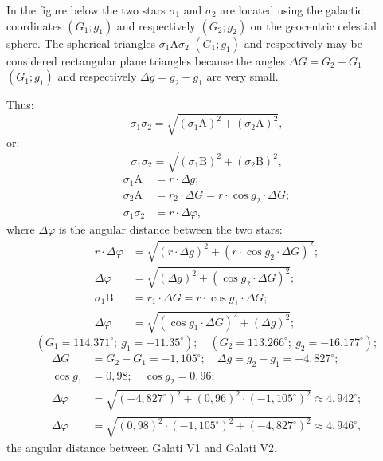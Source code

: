 In the figure below the two stars $\sigma_1$ and $\sigma_2$ are located using
the galactic coordinates $(G_1; g_1)$ and respectively $(G_2; g_2)$ on the
geocentric celestial sphere. The spherical triangles $\sigma_1 \mathrm{A}
\sigma_2$ $(G_1;g_1)$ and respectively %
may be considered rectangular plane triangles because the angles
$\Delta G = G_2 - G_1$ $(G_1;g_1)$ and respectively $\Delta g = g_2 - g_1$
are very small.

Thus:
\[ \sigma_1\sigma_2 = \sqrt{(\sigma_1 \mathrm{A})^2 + (\sigma_2 \mathrm{A})^2}, \]
or:
\[ \sigma_1\sigma_2 = \sqrt{(\sigma_1 \mathrm{B})^2 + (\sigma_2 \mathrm{B})^2}, \]
\begin{align*}
\sigma_1 \mathrm{A} &= r \cdot \Delta g;\\
\sigma_2 \mathrm{A} &= r_2 \cdot \Delta G = r \cdot \cos g_2 \cdot \Delta G;\\
\sigma_1 \sigma_2 &= r \cdot \Delta\varphi,
\end{align*}
where $\Delta\varphi$ is the angular distance between the two stars:
\begin{align*}
r \cdot \Delta\varphi &= \sqrt{(r \cdot \Delta g)^2
  + (r \cdot \cos g_2 \cdot \Delta G)^2};\\
\Delta\varphi &= \sqrt{(\Delta g)^2 + (\cos g_2 \cdot \Delta G)^2};\\
\sigma_1 \mathrm{B} &= r_1 \cdot \Delta G = r \cdot \cos g_1 \cdot \Delta G;\\
\Delta\varphi &= \sqrt{(\cos g_1 \cdot \Delta G)^2 + (\Delta g)^2};
\end{align*}
\[ (G_1 = 114.371^\circ;\ g_1 = -11.35^\circ);\quad
   (G_2 = 113.266^\circ;\ g_2 = -16.177^\circ);
\]
\begin{align*}
\Delta G &= G_2 - G_1 = -1{,}105^\circ;\quad
  \Delta g = g_2 - g_1 = -4{,}827^\circ;\\
\cos g_1 &= 0{,}98;\quad \cos g_2 = 0{,}96;\\
\Delta\varphi &= \sqrt{(-4{,}827^\circ)^2
  + (0{,}96)^2\cdot(-1{,}105^\circ)^2} \approx 4{,}942^\circ;\\
\Delta\varphi &= \sqrt{(0{,}98)^2\cdot(-1{,}105^\circ)^2
  + (-4{,}827^\circ)^2} \approx 4{,}946^\circ,
\end{align*}
the angular distance between Galati V1 and Galati V2.
